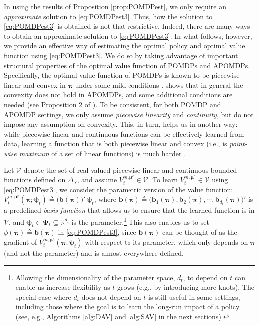 \documentclass[opre,nonblindrev]{informs2}%
\newcommand{\teq}{\triangleq}
\newcommand{\1}{\hbox{\rm 1\kern-.35em 1}}
\newcommand{\MS}{\mathscr S}
\newcommand{\MV}{\mathscr V}
\newcommand{\bpi}{\boldsymbol{\pi}}
\newcommand{\bmu}{\boldsymbol{\mu}}
\newcommand{\bpsi}{\boldsymbol{\psi}}
\newcommand{\bPsi}{\boldsymbol{\Psi}}
\newcommand{\bb}{\mathbf{b}}
\begin{document}
\begin{remark}  In using the results of Proposition \ref{prop:POMDPest},  we only require an {\em approximate} solution to \eqref{eq:POMDPest3}. Thus, how the solution to \eqref{eq:POMDPest3} is obtained is not that restrictive. Indeed, there are many ways to obtain an approximate solution to \eqref{eq:POMDPest3}. In what follows, however, we provide an effective way of estimating the optimal policy and optimal value function using \eqref{eq:POMDPest3}. We do so by taking advantage of  important structural properties of the optimal value function of POMDPs and APOMDPs. Specifically, the optimal value function of POMDPs is known to be piecewise linear and convex in $\bpi$ under some mild conditions \citep{Sondik_Finite_1973}. \cite{Saghafian2018} shows that in general the convexity does not hold in APOMDPs, and some additional conditions are needed (see Proposition 2 of \cite{Saghafian2018}). To be consistent, for both POMDP and APOMDP settings, we only assume {\em piecewise linearity} and {\em continuity}, but do not impose any assumption on convexity. This, in turn, helps us in another way: while piecewise linear and continuous functions can be effectively learned from data, learning a function that is both piecewise linear and convex (i.e., is {\em point-wise maximum} of a set of linear functions) is much harder \citep[see, e.g.,][and the references therein]{Magnani2009}.
\end{remark}

Let $\MV$ denote the set of  real-valued piecewise linear and continuous bounded functions defined on $\Delta_\MS$, and assume $V_t^{m,\bmu^e}\in\MV$. To learn $V_t^{m,\bmu^e}\in\MV$ using \eqref{eq:POMDPest3}, we consider the parametric version of the value function:  $V_t^{m,\bmu^e}(\bpi;\bpsi_t)\teq \big(\bb (\bpi))'\, \bpsi_t$, where $\bb (\bpi)\teq\big(\bb_1 (\bpi), \bb_2 (\bpi),\cdots, \bb_{d_t} (\bpi)\big)'$ is a predefined {\em basis function} that allows us to ensure that the learned function is in $\MV$, and $\bpsi_t \in \bPsi_t\subseteq \mathbb R^{d_t}$ is the parameter.\footnote{Allowing the dimensionality of the parameter space, $d_t$, to depend on $t$ can enable us increase flexibility as $t$ grows (e.g., by introducing more knots). The special case where $d_t$ does not depend on $t$ is still useful in some settings, including those where the goal is to learn the long-run impact of a policy (see, e.g., Algorithms \ref{alg:DAV} and \ref{alg:SAV} in the next sections).} This also enables us to set $\phi(\bpi)\teq \bb (\bpi)$ in \eqref{eq:POMDPest3},  since $\bb (\bpi)$ can be thought of as the gradient of $V_t^{m,\bmu^e}(\bpi;\bpsi_t)$ with respect to its parameter, which only depends on $\bpi$ (and not the parameter) and is almost everywhere defined.
\end{document}
